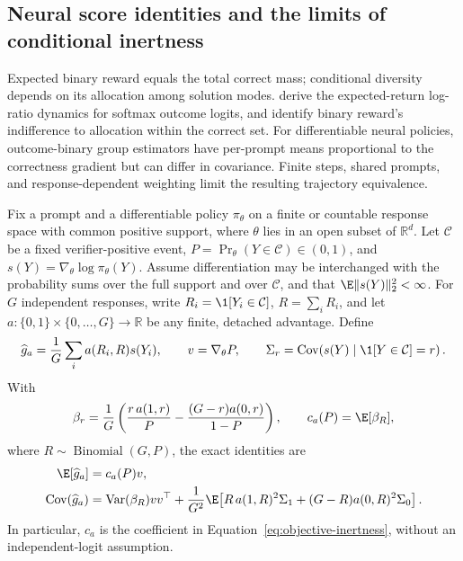 \subsection{Neural score identities and the limits of conditional inertness}
\label{app:neural-binary-inertness}

Expected binary reward equals the total correct mass; conditional diversity
depends on its allocation among solution modes.
\citet[Theorem~3.1, v1]{sinha2026expected} derive the expected-return
log-ratio dynamics for softmax outcome logits, and
\citet[Section~4.1, v1]{lochab2026ucpo} identify binary reward's
indifference to allocation within the correct set. For differentiable neural
policies, outcome-binary group estimators have per-prompt means proportional
to the correctness gradient but can differ in covariance. Finite steps,
shared prompts, and response-dependent weighting limit the resulting
trajectory equivalence.

\begin{theorem}
\enforcehalffinalproseline
\label{thm:neural-binary-moments}
Fix a prompt and a differentiable policy $\pi_\theta$ on a finite or countable
response space with common positive support, where $\theta$ lies in an open
subset of $\mathbb R^d$. Let $\mathcal C$ be a fixed verifier-positive event,
$P=\Pr_\theta(Y\in\mathcal C)\in(0,1)$, and
$s(Y)=\nabla_\theta\log\pi_\theta(Y)$. Assume differentiation may be
interchanged with the probability sums over the full support and over
$\mathcal C$, and that $\E\|s(Y)\|_2^2<\infty$. For $G$ independent
responses, write $R_i=\1[Y_i\in\mathcal C]$, $R=\sum_iR_i$, and let
$a:\{0,1\}\times\{0,\ldots,G\}\to\mathbb R$ be any finite, detached
advantage. Define
\[
 \widehat g_a=\frac1G\sum_i a(R_i,R)s(Y_i),\qquad
 v=\nabla_\theta P,\qquad
 \Sigma_r=\operatorname{Cov}\!\left(s(Y)\mid\1[Y\in\mathcal C]=r\right).
\]
With
\[
 \beta_r=\frac1G\left(\frac{r\,a(1,r)}P
          -\frac{(G-r)a(0,r)}{1-P}\right),
 \qquad c_a(P)=\E[\beta_R],
\]
where $R\sim\operatorname{Binomial}(G,P)$, the exact identities are
\begin{align}
 \E[\widehat g_a]&=c_a(P)v,
 \label{eq:neural-binary-mean}\\
 \operatorname{Cov}(\widehat g_a)
 &=\operatorname{Var}(\beta_R)vv^\top
   +\frac1{G^2}\E\!\left[
       R\,a(1,R)^2\Sigma_1+(G-R)a(0,R)^2\Sigma_0\right].
 \label{eq:neural-binary-covariance}
\end{align}
In particular, $c_a$ is the coefficient in
Equation~\eqref{eq:objective-inertness}, without an independent-logit
assumption.
\end{theorem}

